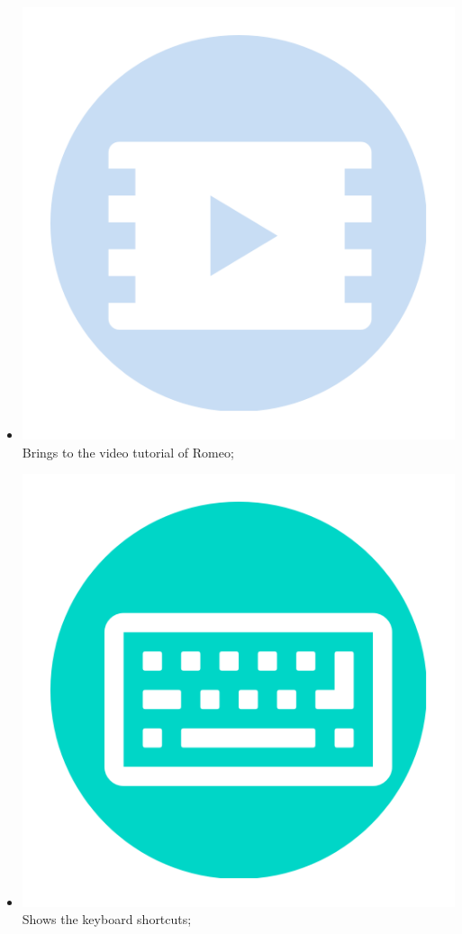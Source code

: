 \begin{itemize}
\item \includegraphics[scale=0.06]{./Images/videoguide} Brings to the video tutorial of Romeo;
\item \includegraphics[scale=0.06]{./Images/shortcuts} Shows the keyboard shortcuts;

\end{itemize}
